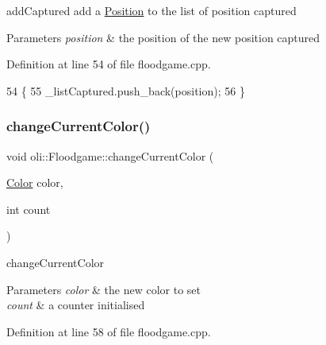 add\+Captured add a \hyperlink{classoli_1_1_position}{Position} to the list of position captured 


\begin{DoxyParams}{Parameters}
{\em position} & the position of the new position captured \\
\hline
\end{DoxyParams}


Definition at line 54 of file floodgame.\+cpp.


\begin{DoxyCode}
54                                             \{
55     \_listCaptured.push\_back(position);
56 \}
\end{DoxyCode}
\hypertarget{classoli_1_1_floodgame_aa6be75fd33a3181117c80529561c1f0c}{}\label{classoli_1_1_floodgame_aa6be75fd33a3181117c80529561c1f0c} 
\subsubsection{\texorpdfstring{change\+Current\+Color()}{changeCurrentColor()}}
{\footnotesize\ttfamily void oli\+::\+Floodgame\+::change\+Current\+Color (\begin{DoxyParamCaption}\item[{\hyperlink{namespaceoli_aac44697e43b3ab2ad32fe892ab2276eb}{Color}}]{color,  }\item[{int}]{count }\end{DoxyParamCaption})}



change\+Current\+Color 


\begin{DoxyParams}{Parameters}
{\em color} & the new color to set \\
\hline
{\em count} & a counter initialised \\
\hline
\end{DoxyParams}


Definition at line 58 of file floodgame.\+cpp.


